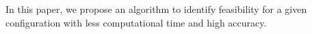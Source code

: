\documentclass[conference]{IEEEtran}
\begin{document}
In this paper,  we propose an algorithm to identify feasibility for a given configuration with less computational time and high
accuracy.
%
\end{document}
